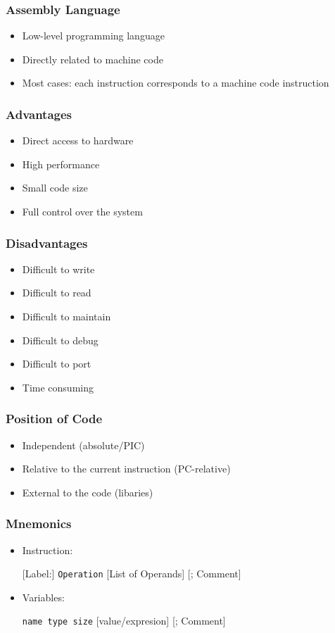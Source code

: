 \begin{frame}
    \frametitle{Assembly Language}
    \begin{itemize}
        \item Low-level programming language
        \item Directly related to machine code
        \item Most cases: each instruction corresponds to a machine code instruction
    \end{itemize}
\end{frame}

\begin{frame}
    \frametitle{Advantages}
    \begin{itemize}
        \item Direct access to hardware
        \item High performance
        \item Small code size
        \item Full control over the system
    \end{itemize}
\end{frame}

\begin{frame}
    \frametitle{Disadvantages}
    \begin{itemize}
        \item Difficult to write
        \item Difficult to read
        \item Difficult to maintain
        \item Difficult to debug
        \item Difficult to port
        \item Time consuming
    \end{itemize}
\end{frame}


\begin{frame}
    \frametitle{Position of Code}
    \begin{itemize}
        \item Independent (absolute/PIC)
        \item Relative to the current instruction (PC-relative)
        \item External to the code (libaries)
    \end{itemize}
\end{frame}


\begin{frame}
    \frametitle{Mnemonics}
    \begin{itemize}
        \item Instruction:
        
        [Label:] \texttt{Operation} [List of Operands] [; Comment]

        \item Variables:
        
        \texttt{name type size} [value/expresion] [; Comment]

    \end{itemize}
\end{frame}

